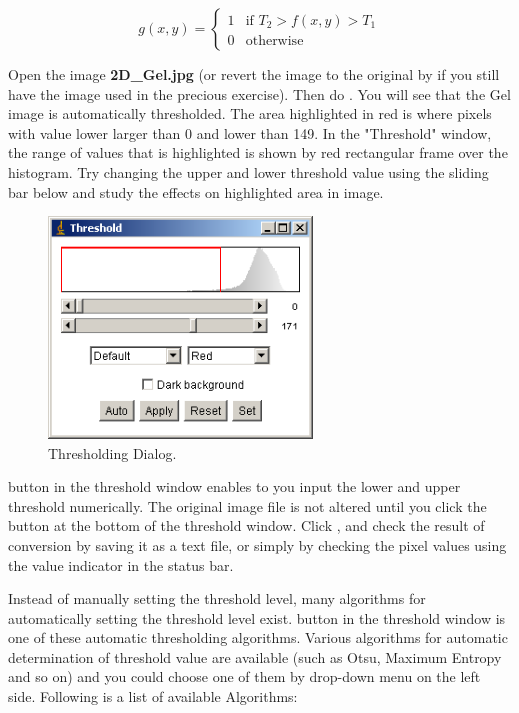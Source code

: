 \begin{equation}
g(x,y)= 
\begin{cases}
1 & \text{if $T_2 > f(x, y) > T_1$}\\
0 & \text{otherwise}
\end{cases}
\end{equation}

\begin{indentexercise}{2}
Open the image \textbf{2D\_Gel.jpg} (or
revert the image to the original by  if you still have the image used in the precious exercise).
Then do . 
You will see that the Gel image is automatically
thresholded. The area highlighted in red is where pixels with value
lower larger than 0 and lower than 149. In the
"Threshold" window, the range of values that is highlighted is shown by red rectangular frame over the
histogram. Try changing the upper and lower threshold value using the
sliding bar below and study the effects on highlighted area in image. 

\begin{figure}[htbp]
\begin{center}
\includegraphics[width=7cm]{fig/CMCIBasicCourse201102-img107.png}
\caption{ Thresholding Dialog.}
\label{fig:img107}
\end{center}
\end{figure}

 button in the threshold
window enables to you input the lower and upper threshold numerically.
The original image file is not altered until you click the button
 at the bottom of the
threshold window. Click , and
check the result of conversion by saving it as a text file, or simply
by checking the pixel values using the value indicator in the status
bar. 
\end{indentexercise}

Instead of manually setting the threshold level, many algorithms for
automatically setting the threshold level exist.
 button in the threshold
window is one of these automatic thresholding algorithms. Various
algorithms for automatic determination of threshold value are available
(such as Otsu, Maximum Entropy and so on) and you could choose one of
them by drop-down menu on the left side. Following is a list of
available Algorithms:


